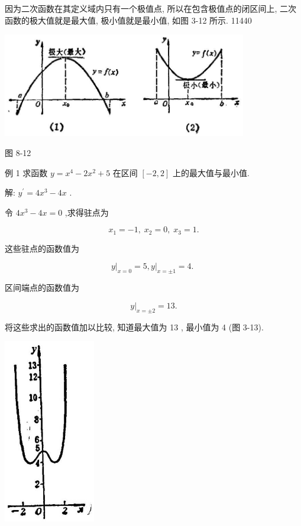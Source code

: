 \documentclass[lang=cn,newtx,10pt,scheme=chinese]{elegantbook}
\begin{document}
因为二次函数在其定义域内只有一个极值点, 所以在包含极值点的闭区间上, 二次函数的极大值就是最大值, 极小值就是最小值, 如图 3-12 所示. 11440

\begin{center}
\includegraphics[max width=0.8\textwidth]{images/01912c18-5c3f-733d-b775-749ba9897a9d_147_605988.jpg}
\end{center}

图 8-12

例 1 求函数 \(y = {x}^{4} - 2{x}^{2} + 5\) 在区间 \(\left\lbrack {-2,2}\right\rbrack\) 上的最大值与最小值.

解: \({y}^{\prime } = 4{x}^{3} - {4x}\) .

令 \(4{x}^{3} - {4x} = 0\) ,求得驻点为

\[
{x}_{1} = - 1,\;{x}_{2} = 0,\;{x}_{3} = 1.
\]

这些驻点的函数值为

\[
{\left. y\right| }_{x = 0} = 5,{\left. y\right| }_{x = \pm 1} = 4\text{. }
\]

区间端点的函数值为

\[
{\left. y\right| }_{x = \pm 2} = {13}\text{.}
\]

将这些求出的函数值加以比较, 知道最大值为 13 , 最小值为 4 (图 3-13).

\begin{center}
\includegraphics[max width=0.3\textwidth]{images/01912c18-5c3f-733d-b775-749ba9897a9d_148_436471.jpg}
\end{center}
\end{document}
